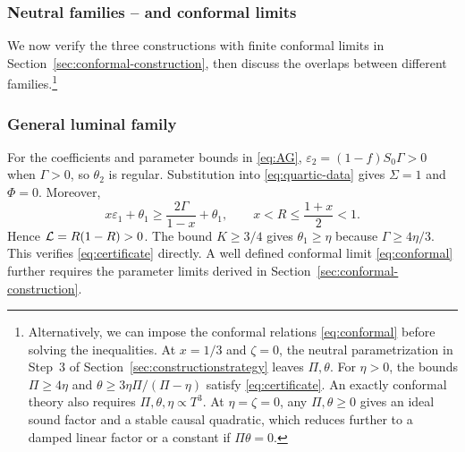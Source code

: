 \subsubsection{Neutral families -- and conformal limits}
\label{app:sec:neutral-conformal-derivations}
We now verify the three constructions with finite conformal limits in
Section~\ref{sec:conformal-construction}, then discuss the overlaps between different families.\footnote{\label{fn:exact-conformal-seed}Alternatively,
we can impose the conformal relations \eqref{eq:conformal} before solving
the inequalities. At $x=1/3$ and $\zeta=0$, the neutral parametrization
in Step~3 of Section~\ref{sec:constructionstrategy} leaves $\Pi,\theta$.
For $\eta>0$, the bounds $\Pi\geq4\eta$ and
$\theta\geq3\eta\Pi/(\Pi-\eta)$ satisfy \eqref{eq:certificate}.
An exactly conformal theory also requires $\Pi,\theta,\eta\propto T^3$.
At $\eta=\zeta=0$, any $\Pi,\theta\geq0$ gives an ideal sound factor
and a stable causal quadratic, which reduces further to a damped linear
factor or a constant if $\Pi\theta=0$.}

\subsubsection*{General luminal family }
\label{app:family:AG}
For the coefficients and parameter bounds in \eqref{eq:AG},
$\varepsilon_2=(1-f)S_0\Gamma>0$ when $\Gamma>0$, so $\theta_2$ is regular.
Substitution into \eqref{eq:quartic-data} gives $\Sigma=1$ and $\Phi=0$.
Moreover,
\begin{equation}
 x\varepsilon_1+\theta_1\geq\frac{2\Gamma}{1-x}+\theta_1,
 \qquad x<R\leq\frac{1+x}{2}<1.
\end{equation}
Hence $\mathcal L=R(1-R)>0$. The bound $K\geq3/4$ gives
$\theta_1\geq\eta$ because $\Gamma\geq4\eta/3$. This verifies
\eqref{eq:certificate} directly.
A well defined conformal limit \eqref{eq:conformal} further requires the parameter limits derived in
Section~\ref{sec:conformal-construction}. 


